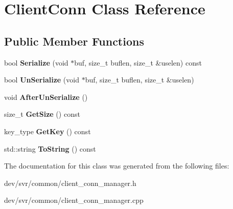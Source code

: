 \hypertarget{classClientConn}{
\section{ClientConn Class Reference}
\label{classClientConn}
}
\subsection*{Public Member Functions}
\begin{DoxyCompactItemize}
\item 
\hypertarget{classClientConn_a1a2fd43aa2ab30f2f075f048ae583d51}{
bool {\bfseries Serialize} (void $\ast$buf, size\_\-t buflen, size\_\-t \&uselen) const }
\label{classClientConn_a1a2fd43aa2ab30f2f075f048ae583d51}

\item 
\hypertarget{classClientConn_ae8d138239a4a0dc02fd101a974ff3140}{
bool {\bfseries UnSerialize} (void $\ast$buf, size\_\-t buflen, size\_\-t \&uselen)}
\label{classClientConn_ae8d138239a4a0dc02fd101a974ff3140}

\item 
\hypertarget{classClientConn_a29857af48103909cb3d4120dc6d0ec7c}{
void {\bfseries AfterUnSerialize} ()}
\label{classClientConn_a29857af48103909cb3d4120dc6d0ec7c}

\item 
\hypertarget{classClientConn_a59e904698741bba3bcdf547cbee25237}{
size\_\-t {\bfseries GetSize} () const }
\label{classClientConn_a59e904698741bba3bcdf547cbee25237}

\item 
\hypertarget{classClientConn_a85b409782141ec830f3bc374b2ae09b0}{
key\_\-type {\bfseries GetKey} () const }
\label{classClientConn_a85b409782141ec830f3bc374b2ae09b0}

\item 
\hypertarget{classClientConn_a0327e6989e7be53a55c208f02b7b8c86}{
std::string {\bfseries ToString} () const }
\label{classClientConn_a0327e6989e7be53a55c208f02b7b8c86}

\end{DoxyCompactItemize}


The documentation for this class was generated from the following files:\begin{DoxyCompactItemize}
\item 
dev/svr/common/client\_\-conn\_\-manager.h\item 
dev/svr/common/client\_\-conn\_\-manager.cpp\end{DoxyCompactItemize}
